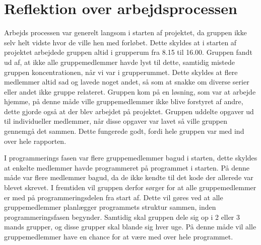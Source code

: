 \section{Reflektion over arbejdsprocessen}\label{Reflektion-over-arbejdsprocessen}
Arbejds processen var generelt langsom i starten af projektet, da gruppen ikke selv helt vidste hvor de ville hen med forløbet. Dette skyldes at i starten af projektet arbejdede gruppen altid i grupperum fra 8.15 til 16.00. Gruppen fandt ud af, at ikke alle gruppemedlemmer havde lyst til dette, samtidig mistede gruppen koncentrationen, når vi var i grupperummet. Dette skyldes at flere medlemmer altid sad og lavede noget andet, så som at snakke om diverse serier eller andet ikke gruppe relateret. Gruppen kom på en løsning, som var at arbejde hjemme, på denne måde ville gruppemedlemmer ikke blive forstyret af andre, dette gjorde også at der blev arbejdet på projektet. Gruppen uddelte opgaver ud til individueller medlemmer, når disse opgaver var lavet så ville gruppen gennemgå det sammen. Dette fungerede godt, fordi hele gruppen var med ind over hele rapporten. 

\vspace{5mm}

I programmerings fasen var flere gruppemedlemmer bagud i starten, dette skyldes at enkelte medlemmer havde programmeret på programmet i starten. På denne måde var flere medlemmer bagud, da de ikke kendte til det kode der allerede var blevet skrevet. I fremtiden vil gruppen derfor sørger for at alle gruppemedlemmer er med på programmeringsdelen fra start af. Dette vil gøres ved at alle gruppemedlemmer planlægger programmets struktur sammen, inden programmeringsfasen begynder. Samtidig skal gruppen dele sig op i 2 eller 3 mands grupper, og disse grupper skal blande sig hver uge. På denne måde vil alle gruppemedlemmer have en chance for at være med over hele programmet.  